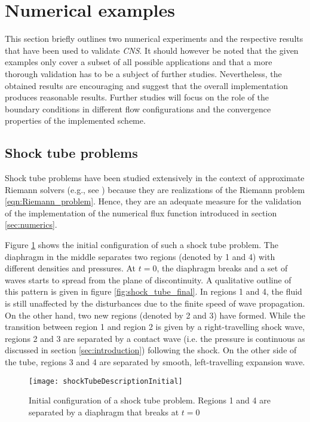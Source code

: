 \section{Numerical examples}
\label{sec:examples}

This section briefly outlines two numerical experiments and the respective
results that have been used to validate \emph{CNS}. It should however be noted
that the given examples only cover a subset of all possible applications and
that a more thorough validation has to be a subject of further studies.
Nevertheless, the obtained results are encouraging and suggest that the overall
implementation produces reasonable results. Further studies will focus on
the role of the boundary conditions in different flow configurations and the
convergence properties of the implemented scheme.


\subsection{Shock tube problems}

Shock tube problems have been studied extensively in the context of approximate
Riemann solvers (e.g., see \cite{Toro2009}) because they are realizations of the
Riemann problem \ref{eqn:Riemann_problem}. Hence, they are an adequate measure
for the validation of the implementation of the numerical flux function
introduced in section \ref{sec:numerics}.

Figure \ref{fig:shock_tube_initial}
shows the initial configuration of such a shock tube problem. The diaphragm in
the middle separates two regions (denoted by 1 and 4) with different densities
and pressures. At $t=0$, the diaphragm breaks and a set of waves starts to
spread from the plane of discontinuity. A qualitative outline of this pattern is
given in figure \ref{fig:shock_tube_final}. In regions 1 and 4, the fluid is
still unaffected by the disturbances due to the finite speed of wave
propagation. On the other hand, two new regions (denoted by 2 and 3) have
formed. While the transition between region 1 and region 2 is given by a
right-travelling shock wave, regions 2 and 3 are separated by a 
contact wave (i.e. the pressure is continuous as discussed in section
\ref{sec:introduction}) following the shock. On the other side of the tube,
regions 3 and 4 are separated by smooth, left-travelling expansion wave.

\begin{figure}
	\centering
	\texttt{[image: shockTubeDescriptionInitial]}
	\caption{Initial configuration of a shock tube problem. Regions 1 and
	4 are separated by a diaphragm that breaks at $t=0$}
	\label{fig:shock_tube_initial}
\end{figure}

